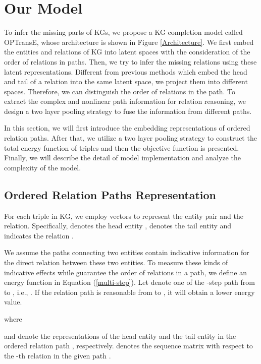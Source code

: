 \documentclass[11pt,a4paper]{article}
\begin{document}
\section{Our Model}

To infer the missing parts of KGs, we propose a KG completion model
called OPTransE, whose architecture is shown in Figure
\ref{Architecture}. We first embed the entities and relations of KG
into latent spaces with the consideration of the order of relations
in paths. Then, we try to infer the missing relations using these
latent representations. Different from previous methods which embed
the head and tail of a relation into the same latent space, we
project them into different spaces. Therefore, we can distinguish
the order of relations in the path. To extract the complex and nonlinear
path information for relation reasoning, we design a two layer pooling
strategy to fuse the information from different paths.

In this section, we will first introduce the embedding
representations of ordered relation paths. After that, we utilize a
two layer pooling strategy to construct the total energy function of
triples and then the objective function is presented. Finally, we
will describe the detail of model implementation and analyze the complexity of the model.

\subsection{Ordered Relation Paths Representation}

For each triple  in KG, we employ vectors to represent the
entity pair and the relation. Specifically,
 denotes the head entity
,  denotes the tail
entity  and  indicates
the relation .

We assume the paths connecting two entities contain indicative
information for the direct relation between these two entities. To
measure these kinds of indicative effects while guarantee the order
of relations in a path, we define an energy function in Equation
(\ref{multi-step}). Let  denote one of the -step
path from  to , i.e., . If the relation
path is reasonable from  to , it will obtain a lower
energy value.

where



 and  denote the representations of
the head entity  and the tail entity  in the ordered relation
path , respectively.
 denotes
the sequence matrix with respect to the -th relation in the given
path .
\end{document}
